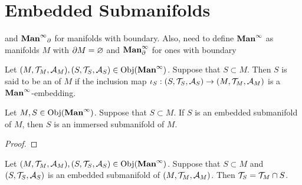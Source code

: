 \documentclass{book}
\begin{document}
	
	

	
	
	
	
	
	
	
	
	
	\newpage
	\section{Embedded Submanifolds}
	
	 and $\operatorname*{\text{\textbf{Man}}^{\infty}}_{\partial}$ for manifolds with boundary. Also, need to define $\operatorname*{\text{\textbf{Man}}^{\infty}}$ as manifolds $M$ with $\partial M = \varnothing$ and $\operatorname*{\text{\textbf{Man}}^{\infty}_{\partial}}$ for ones with boundary

	\begin{defn} 
		Let $(M, \mathcal{T}_M, \mathcal{A}_M), (S, \mathcal{T}_S, \mathcal{A}_S) \in \operatorname{Obj}(\operatorname*{\text{\textbf{Man}}^{\infty}})$. Suppose that $S \subset M$. Then $S$ is said to be an  of $M$ if the inclusion map $\iota_S:(S, \mathcal{T}_S, \mathcal{A}_S) \rightarrow (M, \mathcal{T}_M, \mathcal{A}_M)$ is a $\operatorname*{\text{\textbf{Man}}^{\infty}}$-embedding.
	\end{defn}

	\begin{ex} 
		Let $M, S \in \operatorname{Obj}(\operatorname*{\text{\textbf{Man}}^{\infty}})$. Suppose that $S \subset M$. If $S$ is an embedded submanifold of $M$, then $S$ is an immersed submanifold of $M$.
	\end{ex}

	\begin{proof}
	\end{proof}

	\begin{ex} 
		Let $(M, \mathcal{T}_M, \mathcal{A}_M), (S, \mathcal{T}_S, \mathcal{A}_S) \in \operatorname{Obj}(\operatorname*{\text{\textbf{Man}}^{\infty}})$. Suppose that $S \subset M$ and $(S, \mathcal{T}_S, \mathcal{A}_S)$ is an embedded submanifold of $(M, \mathcal{T}_M, \mathcal{A}_M)$. Then $\mathcal{T}_S = \mathcal{T}_M \cap S$. 
	\end{ex}
	
\end{document}

